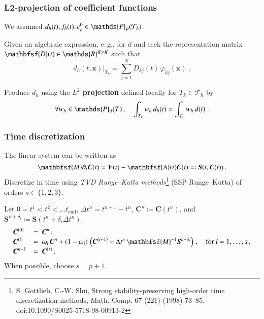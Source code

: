 \documentclass[final,12pt]{beamer}
\newcommand{\IP}{\ensuremath\mathds{P}}
\newcommand{\IR}{\ensuremath\mathds{R}}
\newcommand*{\setT}{\ensuremath{\mathcal{T}}}                    %
\newcommand*{\vphi}{\varphi}                                     %
\renewcommand*{\vec}[1]{{\boldsymbol{#1}}}                       %
\newcommand*{\vecc}[1]{\mathbfsf{#1}}                            %
\begin{document}
\begin{frame}
\frametitle{L2-projection of coefficient functions}
  We assumed $d_h(t), f_h(t), c_h^0 \in \IP_p(\setT_h)$.

  Given an algebraic expression, e.\,g., for $d$ and seek the representation matrix $\vecc{D}(t) \in \IR^{K\times K}$ such that
  \begin{equation*}
    d_h(t,\vec{x})\big|_{T_k} = \sum_{j=1}^N D_{kj}(t)\, \vphi_{kj}(\vec{x})\;.
  \end{equation*}

  Produce $d_h$ using the \textbf{$L^2$ projection} defined locally for $T_k \in \setT_h$ by
  \begin{equation*}
    \forall w_h \in \IP_d(T)\,, \quad \int_{T_k} w_h\, d_h(t) = \int_{T_k} w_h\, d(t)\;.
  \end{equation*}
\end{frame}

\begin{frame}
\frametitle{Time discretization}
  The linear system can be written as
  \begin{equation*}
    \vecc{M}\partial_t \vec{C}(t) = \vec{V}(t) - \vecc{A}(t) \vec{C}(t) \eqqcolon \vec{S}(t, \vec{C}(t))\,.
  \end{equation*}
  Discretize in time using \emph{TVD Runge--Kutta methods}\footnote{S. Gottlieb, C.-W. Shu, Strong stability-preserving high-order time discretization methods, Math. Comp. 67 (221) (1998) 73–85. doi:10.1090/S0025-5718-98-00913-2} (SSP Runge--Kutta) of orders \emph{$s \in \{1,2,3\}$}.
  \par
  Let $0 = t^1 < t^2 < \ldots t_\mathrm{end}$, $\Delta t^n = t^{n+1} - t^n$,
  $\vec{C}^n \coloneqq \vec{C}(t^n)$, and
  $\vec{S}^{n+\delta_i} \coloneqq \vec{S}(t^n+\delta_i\Delta t^n)$.
  \begin{equation*}
    \begin{array}{lll}
    \vec{C}^{(0)} &=\; \vec{C}^{n} \,, \\
    \vec{C}^{(i)} &=\; \omega_i\,\vec{C}^{n} + (1-\omega_i)\,\left( \vec{C}^{(i-1)}
    + \Delta t^n\,\vecc{M}^{-1} \vec{S}^{n + \delta_i} \right) \,, \quad \text{for}~i = 1,\ldots,s\,,\\
    \vec{C}^{n+1} &=\; \vec{C}^{(s)} \,.
    \end{array}
  \end{equation*}
  When possible, choose $s = p+1$.
\end{frame}
\end{document}
